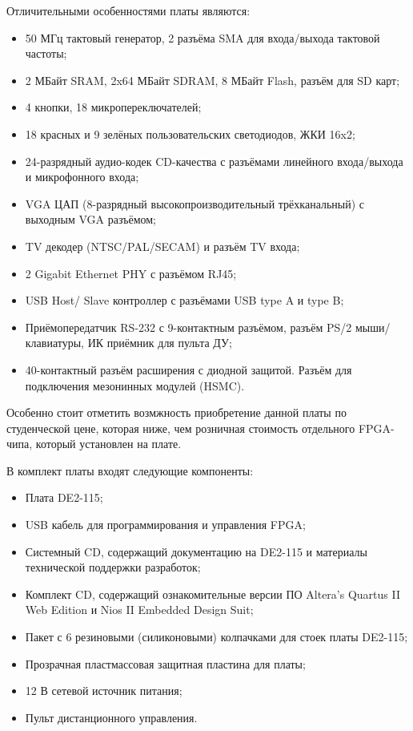 Отличительными особенностями платы являются:
\begin{itemize}
	\item 50 МГц тактовый генератор, 2 разъёма SMA для входа/выхода тактовой частоты;
	\item 2 МБайт SRAM, 2x64 МБайт SDRAM, 8 МБайт Flash, разъём для SD карт;
	\item 4 кнопки, 18 микропереключателей;
	\item 18 красных и 9 зелёных пользовательских светодиодов, ЖКИ 16x2;
	\item 24-разрядный аудио-кодек CD-качества с разъёмами линейного входа/выхода и микрофонного входа;
	\item VGA ЦАП (8-разрядный высокопроизводительный трёхканальный) с выходным VGA разъёмом;
	\item TV декодер (NTSC/PAL/SECAM) и разъём TV входа;
	\item 2 Gigabit Ethernet PHY с разъёмом RJ45;
	\item USB Host/ Slave контроллер с разъёмами USB type A и type B;
	\item Приёмопередатчик RS-232 с 9-контактным разъёмом, разъём PS/2 мыши/клавиатуры, ИК приёмник для пульта ДУ;
	\item 40-контактный разъём расширения с диодной защитой. Разъём для подключения мезонинных модулей (HSMC).
\end{itemize}

Особенно стоит отметить возмжность приобретение данной платы по студенческой цене, которая ниже, чем розничная стоимость отдельного FPGA-чипа, который установлен на плате.

В комплект платы \boardname{} входят следующие компоненты:
\begin{itemize}
	\item Плата DE2-115;
	\item USB кабель для программирования и управления FPGA;
	\item Системный CD, содержащий документацию на DE2-115 и материалы технической поддержки разработок;
	\item Комплект CD, содержащий ознакомительные версии ПО Altera’s Quartus II Web Edition и Nios II Embedded Design Suit;
	\item Пакет с 6 резиновыми (силиконовыми) колпачками для стоек платы DE2-115;
	\item Прозрачная пластмассовая защитная пластина для платы;
	\item 12 В сетевой источник питания;
	\item Пульт дистанционного управления.
\end{itemize}

